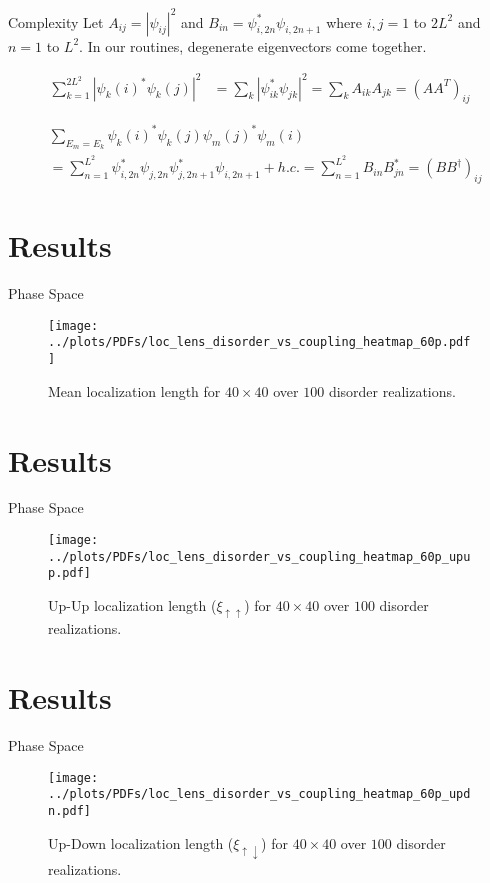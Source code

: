 \documentclass[]{beamer}
\begin{document}
\begin{frame}{Complexity}
    Let $A_{ij} = |\psi_{ij}|^2$ and $B_{in} = \psi_{i,2n}^*
    \psi_{i,2n+1}$ where $i,j = 1$ to $2L^2$ and $n = 1$ to
    $L^2$. In our routines, degenerate eigenvectors come
    together.

    \begin{align*}
        \sum_{k=1}^{2L^2} |\psi_k(i)^* \psi_k(j)|^2 &= \sum_{k}|\psi_{ik}^*\psi_{jk}|^2 = \sum_k A_{ik}A_{jk} = (AA^T)_{ij}
    \end{align*}

    \begin{align*}
        &\sum_{E_m = E_k} \psi_k(i)^*\psi_k(j)\psi_m(j)^*\psi_m(i)\\
        &= \sum_{n=1}^{L^2} \psi_{i,2n}^* \psi_{j,2n} \psi_{j,2n+1}^* \psi_{i,2n+1}
        + h.c.
        = \sum_{n=1}^{L^2} B_{in} B_{jn}^* = (B B^\dagger)_{ij}
    \end{align*}    
\end{frame}

\section{Results}
\begin{frame}{Phase Space}
    \begin{figure}
        \centering
        \texttt{[image: ../plots/PDFs/loc\_lens\_disorder\_vs\_coupling\_heatmap\_60p.pdf]}
        \caption{Mean localization length for $40\times40$ over $100$ disorder realizations.}
    \end{figure}    
\end{frame}

\section{Results}
\begin{frame}{Phase Space}
    \begin{figure}
        \centering
        \texttt{[image: ../plots/PDFs/loc\_lens\_disorder\_vs\_coupling\_heatmap\_60p\_upup.pdf]}
        \caption{Up-Up localization length ($\xi_{\uparrow\uparrow}$) for $40\times40$ over $100$ disorder realizations.}
    \end{figure}    
\end{frame}

\section{Results}
\begin{frame}{Phase Space}
    \begin{figure}
        \centering
        \texttt{[image: ../plots/PDFs/loc\_lens\_disorder\_vs\_coupling\_heatmap\_60p\_updn.pdf]}
        \caption{Up-Down localization length ($\xi_{\uparrow\downarrow}$) for $40\times40$ over $100$ disorder realizations.}
    \end{figure}    
\end{frame}
\end{document}
